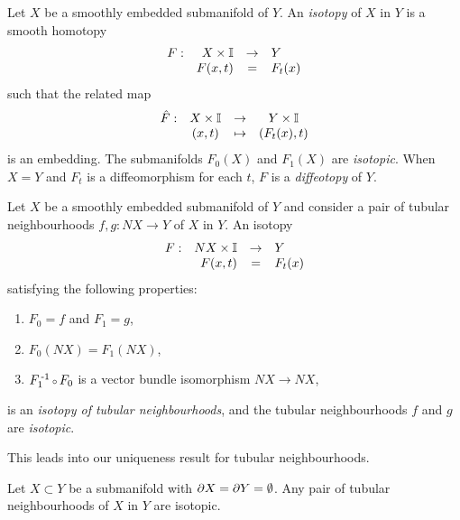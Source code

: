 \begin{defn}[Isotopy]
	\label{def:isotopy}
	Let $X$ be a smoothly embedded submanifold of $Y$.
	An \emph{isotopy} of $X$ in $Y$ is a smooth homotopy
	\[
		\begin{array}{crcl}
			F: & X\times \mathbb{I} & \to & Y \\
			   & F(x,t) & = & F_t(x)
		\end{array}
	\]
	such that the related map
	\[
		\begin{array}{cccc}
			\hat{F}: & X\times\mathbb{I} & \to & Y\times\mathbb{I} \\
					 & (x,t) & \mapsto & (F_t(x),t)
		\end{array}
	\]
	is an embedding.
	The submanifolds $F_0(X)$ and $F_1(X)$ are \emph{isotopic}.
	When $X=Y$ and $F_t$ is a diffeomorphism for each $t$, $F$ is a \emph{diffeotopy} of $Y$.
	
	Let $X$ be a smoothly embedded submanifold of $Y$ and consider a pair of tubular neighbourhoods $f,g:NX\to Y$ of $X$ in $Y$.
	An isotopy
	\[
		\begin{array}{crcl}
			F: & NX\times\mathbb{I} & \to & Y \\
			   & F(x,t) & = & F_t(x)
		\end{array}
	\]
	satisfying the following properties:
	\begin{enumerate}
		\item $F_0=f$ and $F_1=g$,
		\item $F_0(NX)=F_1(NX)$,
		\item $F_1\inv\comp F_0$ is a vector bundle isomorphism $NX\to NX$,
	\end{enumerate}
	 is an \emph{isotopy of tubular neighbourhoods}, and the tubular neighbourhoods $f$ and $g$ are \emph{isotopic}.
\end{defn}

This leads into our uniqueness result for tubular neighbourhoods.

\begin{prop}
	\label{prop:uniquenesstubularneighbourhood}
	Let $X\subset Y$ be a submanifold with $\partial X=\partial Y=\emptyset$.
	Any pair of tubular neighbourhoods of $X$ in $Y$ are isotopic.
\end{prop}	

